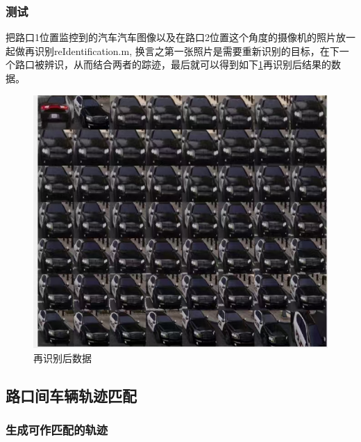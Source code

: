 \subsubsection{测试}

把路口1位置监控到的汽车汽车图像以及在路口2位置这个角度的摄像机的照片放一起做再识别reIdentification.m, 换言之第一张照片是需要重新识别的目标，在下一个路口被辨识，从而结合两者的踪迹，最后就可以得到如下\ref{fig:p15}再识别后结果的数据。






\begin{figure}[htbp] %
	\centering
	\includegraphics[width=1\textwidth]{p15} %
	\caption{再识别后数据} %
	\label{fig:p15} %
\end{figure}









\subsection{路口间车辆轨迹匹配}
\subsubsection{生成可作匹配的轨迹}

